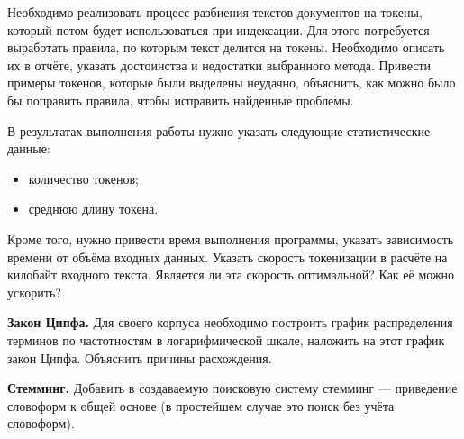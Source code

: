 
Необходимо реализовать процесс разбиения текстов документов на токены, который
потом будет использоваться при индексации. Для этого потребуется выработать
правила, по которым текст делится на токены. Необходимо описать их в отчёте,
указать достоинства и недостатки выбранного метода. Привести примеры токенов,
которые были выделены неудачно, объяснить, как можно было бы поправить правила,
чтобы исправить найденные проблемы.

В результатах выполнения работы нужно указать следующие статистические данные:

\begin{itemize}
    \item количество токенов;
    \item среднюю длину токена.
\end{itemize}

Кроме того, нужно привести время выполнения программы, указать зависимость
времени от объёма входных данных. Указать скорость токенизации в расчёте на
килобайт входного текста. Является ли эта скорость оптимальной? Как её можно
ускорить?

\textbf{Закон Ципфа.} Для своего корпуса необходимо построить график
распределения терминов по частотностям в логарифмической шкале, наложить на
этот график закон Ципфа. Объяснить причины расхождения.

\textbf{Стемминг.} Добавить в создаваемую поисковую систему стемминг ---
приведение словоформ к общей основе (в простейшем случае это поиск без учёта
словоформ).

\pagebreak
